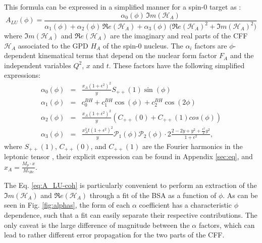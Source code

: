 \documentclass[aps,prc,preprint,superscriptaddress]{revtex4}
\begin{document}
This formula can be expressed in a simplified manner for a spin-0 target as \cite{Belitsky:2008bz}:
\begin{equation}
A_{LU}(\phi) = \frac{\alpha_{0}(\phi) \, \Im m(\mathcal{H}_{A})}
{\alpha_{1}(\phi) + \alpha_{2}(\phi) \, \Re e(\mathcal{H}_{A}) + \alpha_{3}(\phi) \, 
\big( 
\Re e(\mathcal{H}_{A})^{2} + \Im m(\mathcal{H}_{A})^{2} \big)}
\label{eq:A_LU-coh}
\end{equation}
where $\Im m(\mathcal{H}_{A})$ and $\Re e(\mathcal{H}_{A})$ are the imaginary 
and real parts of the CFF $\mathcal{H}_{A}$ associated to the GPD $H_A$ of the 
spin-0 nucleus. The 
$\alpha_{i}$ factors are $\phi$-dependent kinematical terms that depend on the 
nuclear form factor $F_A$ and the independent variables $Q^2$, $x$ and $t$.  
These factors have the following simplified expressions:
\begin{eqnarray}
	\label{eq:alpha1}
   \alpha_0 (\phi) & = &\frac{x_{A}(1+\epsilon^2)^2}{y} S_{++}(1) \sin(\phi)\\
    \alpha_1 (\phi) & = & c_0^{BH}+c_1^{BH} \cos({\phi})+c_2^{BH} \cos(2\phi)\\ 
   \alpha_2 (\phi) & = & \frac{x_{A}(1+\epsilon^2)^2}{y}  \left( C_{++}(0) +  
C_{++}(1) cos(\phi) \right)\\
\alpha_3 (\phi) &=& \frac{x^{2}_{A}t(1+\epsilon^2)^2}{y} {\mathcal P}_1(\phi) 
{\mathcal P}_2(\phi) \cdot 2 \frac{2-2y+y^2 + \frac{\epsilon^2}{2}y^2}{1 + 
\epsilon^2},
	\label{eq:alpha4}
\end{eqnarray}
where $S_{++}(1)$, $C_{++}(0)$, and $C_{++}(1)$ are the Fourier harmonics in the 
leptonic tensor \cite{Belitsky:2008bz}, their explicit expression can be found in 
Appendix \ref{sec:eq}, and $x_{A} = \frac{M_{p}\cdot x}{M_{^4\!He}}$. 

The Eq. \ref{eq:A_LU-coh} is particularly convenient to perform an extraction of 
the $\Im m(\mathcal{H}_{A})$ and $\Re e(\mathcal{H}_{A})$ through a fit of the BSA as 
a function of $\phi$. As can be seen in Fig. \ref{fig:alphas}, the form of each 
$\alpha$ coefficient has a characteristic $\phi$ dependence, such that a fit can
easily separate their respective contributions. The only caveat
is the large difference of magnitude between the $\alpha$ factors, which can lead to 
rather different error propagation for the two parts of the CFF.
\end{document}
